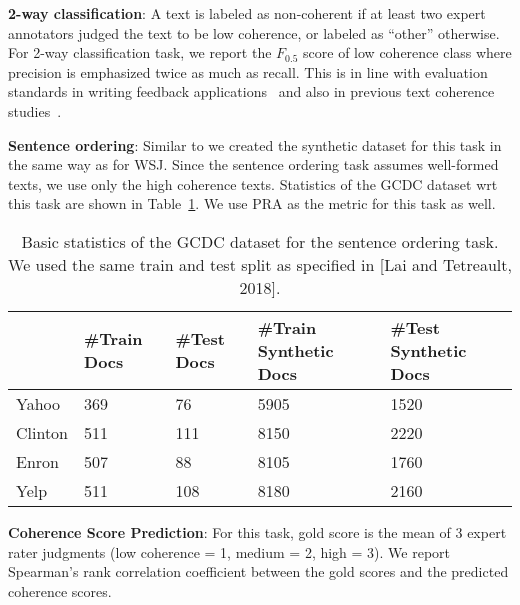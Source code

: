 \documentclass[11pt]{article}
\begin{document}
\noindent\textbf{2-way classification}: A text is labeled as non-coherent if at least two expert annotators judged the text to be low coherence, or labeled as ``other'' otherwise. For 2-way classification task, we report the $F_{0.5}$ score of low coherence class where precision is emphasized twice as much as recall. This is in line with evaluation standards in writing feedback applications~\cite{ng2014conll} and also in previous text coherence studies~\cite{lai2018discourse}.

\noindent\textbf{Sentence ordering}: Similar to \cite{lai2018discourse} we created the synthetic dataset for this task in the same way as for WSJ. Since the sentence ordering task assumes well-formed texts, we use
only the high coherence texts. Statistics of the GCDC dataset wrt this task are shown in Table~\ref{tab:gcdcStats2}. We use PRA as the metric for this task as well.

\begin{table}
    \centering
    \scriptsize
    \begin{tabular}{|l|l|l|p{0.7in}|p{0.6in}|}
\hline
&\#Train Docs&\#Test Docs&\#Train Synthetic Docs&\#Test Synthetic Docs\\
\hline
Yahoo&369&76&5905&1520\\
\hline
Clinton&511&111&8150&2220\\
\hline
Enron&507&88&8105&1760\\
\hline
Yelp&511&108&8180&2160\\
\hline
    \end{tabular}
    \caption{Basic statistics of the GCDC dataset for the sentence ordering task. We used the same train and test split as specified in [Lai and Tetreault, 2018].}
    \label{tab:gcdcStats2}
\end{table}

\noindent\textbf{Coherence Score Prediction}: For this task, gold score is the mean of 3 expert rater judgments (low coherence = 1, medium = 2, high = 3). We report Spearman's rank correlation coefficient between the gold scores and the predicted coherence scores.
\end{document}
